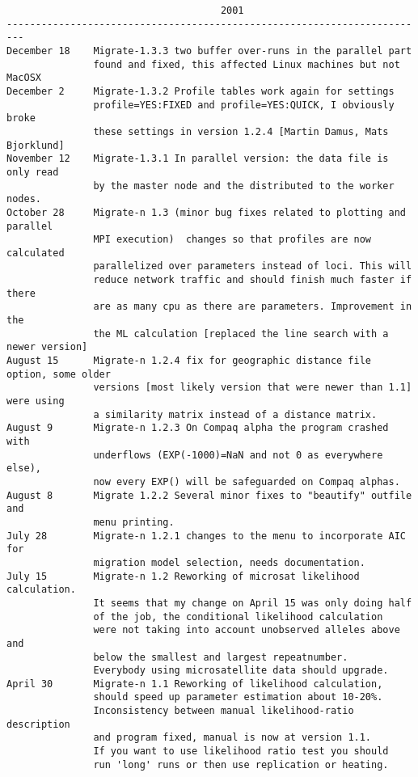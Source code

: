 \begin{small}
\begin{verbatim}
                                     2001
-------------------------------------------------------------------------
December 18    Migrate-1.3.3 two buffer over-runs in the parallel part
               found and fixed, this affected Linux machines but not MacOSX
December 2     Migrate-1.3.2 Profile tables work again for settings 
               profile=YES:FIXED and profile=YES:QUICK, I obviously broke 
               these settings in version 1.2.4 [Martin Damus, Mats Bjorklund]
November 12    Migrate-1.3.1 In parallel version: the data file is only read 
               by the master node and the distributed to the worker nodes.
October 28     Migrate-n 1.3 (minor bug fixes related to plotting and parallel 
               MPI execution)  changes so that profiles are now calculated 
               parallelized over parameters instead of loci. This will 
               reduce network traffic and should finish much faster if there 
               are as many cpu as there are parameters. Improvement in the
               the ML calculation [replaced the line search with a newer version]
August 15      Migrate-n 1.2.4 fix for geographic distance file option, some older 
               versions [most likely version that were newer than 1.1] were using
               a similarity matrix instead of a distance matrix.
August 9       Migrate-n 1.2.3 On Compaq alpha the program crashed with
               underflows (EXP(-1000)=NaN and not 0 as everywhere else),
               now every EXP() will be safeguarded on Compaq alphas.
August 8       Migrate 1.2.2 Several minor fixes to "beautify" outfile and
               menu printing.
July 28        Migrate-n 1.2.1 changes to the menu to incorporate AIC for
               migration model selection, needs documentation.
July 15        Migrate-n 1.2 Reworking of microsat likelihood calculation.
               It seems that my change on April 15 was only doing half
               of the job, the conditional likelihood calculation
               were not taking into account unobserved alleles above and
               below the smallest and largest repeatnumber.
               Everybody using microsatellite data should upgrade. 
April 30       Migrate-n 1.1 Reworking of likelihood calculation,
               should speed up parameter estimation about 10-20%.
               Inconsistency between manual likelihood-ratio description
               and program fixed, manual is now at version 1.1.
               If you want to use likelihood ratio test you should
               run 'long' runs or then use replication or heating.        

\end{verbatim}
\end{small}
